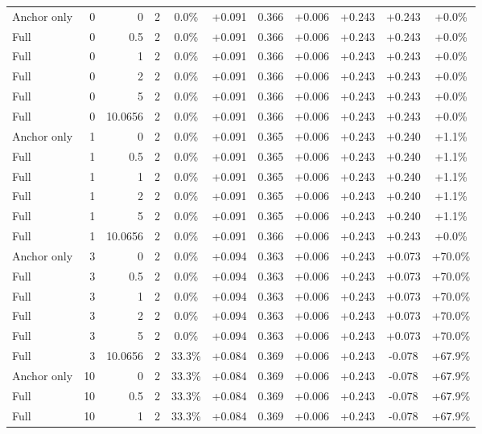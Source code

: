 \begin{table}[htbp]
\begin{tabular}{lrrrccccccc}
Anchor only & 0 & 0 & 2 & 0.0\% & +0.091 & 0.366 & +0.006 & +0.243 & +0.243 & +0.0\% \\
Full & 0 & 0.5 & 2 & 0.0\% & +0.091 & 0.366 & +0.006 & +0.243 & +0.243 & +0.0\% \\
Full & 0 & 1 & 2 & 0.0\% & +0.091 & 0.366 & +0.006 & +0.243 & +0.243 & +0.0\% \\
Full & 0 & 2 & 2 & 0.0\% & +0.091 & 0.366 & +0.006 & +0.243 & +0.243 & +0.0\% \\
Full & 0 & 5 & 2 & 0.0\% & +0.091 & 0.366 & +0.006 & +0.243 & +0.243 & +0.0\% \\
Full & 0 & 10.0656 & 2 & 0.0\% & +0.091 & 0.366 & +0.006 & +0.243 & +0.243 & +0.0\% \\
Anchor only & 1 & 0 & 2 & 0.0\% & +0.091 & 0.365 & +0.006 & +0.243 & +0.240 & +1.1\% \\
Full & 1 & 0.5 & 2 & 0.0\% & +0.091 & 0.365 & +0.006 & +0.243 & +0.240 & +1.1\% \\
Full & 1 & 1 & 2 & 0.0\% & +0.091 & 0.365 & +0.006 & +0.243 & +0.240 & +1.1\% \\
Full & 1 & 2 & 2 & 0.0\% & +0.091 & 0.365 & +0.006 & +0.243 & +0.240 & +1.1\% \\
Full & 1 & 5 & 2 & 0.0\% & +0.091 & 0.365 & +0.006 & +0.243 & +0.240 & +1.1\% \\
Full & 1 & 10.0656 & 2 & 0.0\% & +0.091 & 0.366 & +0.006 & +0.243 & +0.243 & +0.0\% \\
Anchor only & 3 & 0 & 2 & 0.0\% & +0.094 & 0.363 & +0.006 & +0.243 & +0.073 & +70.0\% \\
Full & 3 & 0.5 & 2 & 0.0\% & +0.094 & 0.363 & +0.006 & +0.243 & +0.073 & +70.0\% \\
Full & 3 & 1 & 2 & 0.0\% & +0.094 & 0.363 & +0.006 & +0.243 & +0.073 & +70.0\% \\
Full & 3 & 2 & 2 & 0.0\% & +0.094 & 0.363 & +0.006 & +0.243 & +0.073 & +70.0\% \\
Full & 3 & 5 & 2 & 0.0\% & +0.094 & 0.363 & +0.006 & +0.243 & +0.073 & +70.0\% \\
Full & 3 & 10.0656 & 2 & 33.3\% & +0.084 & 0.369 & +0.006 & +0.243 & -0.078 & +67.9\% \\
Anchor only & 10 & 0 & 2 & 33.3\% & +0.084 & 0.369 & +0.006 & +0.243 & -0.078 & +67.9\% \\
Full & 10 & 0.5 & 2 & 33.3\% & +0.084 & 0.369 & +0.006 & +0.243 & -0.078 & +67.9\% \\
Full & 10 & 1 & 2 & 33.3\% & +0.084 & 0.369 & +0.006 & +0.243 & -0.078 & +67.9\% \\

\end{tabular}
\end{table}
